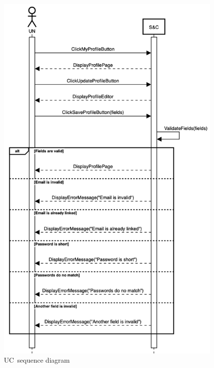 \begin{figure}
    \centering
    \includegraphics[width=12cm]{images/sequence-diagrams/university-updates-profile.png}
    \caption{UC\theuc\ sequence diagram}
\end{figure}



